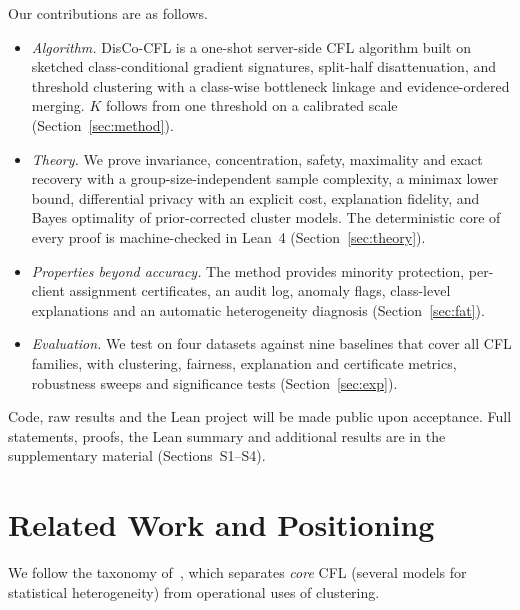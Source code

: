 \documentclass[journal]{IEEEtran}
\theoremstyle{definition}
\begin{document}
Our contributions are as follows.
\begin{itemize}
\item \emph{Algorithm.} DisCo-CFL is a one-shot server-side CFL algorithm built on sketched class-conditional gradient signatures, split-half disattenuation, and threshold clustering with a class-wise bottleneck linkage and evidence-ordered merging. $K$ follows from one threshold on a calibrated scale (Section~\ref{sec:method}).
\item \emph{Theory.} We prove invariance, concentration, safety, maximality and exact recovery with a group-size-independent sample complexity, a minimax lower bound, differential privacy with an explicit cost, explanation fidelity, and Bayes optimality of prior-corrected cluster models. The deterministic core of every proof is machine-checked in Lean~4 (Section~\ref{sec:theory}).
\item \emph{Properties beyond accuracy.} The method provides minority protection, per-client assignment certificates, an audit log, anomaly flags, class-level explanations and an automatic heterogeneity diagnosis (Section~\ref{sec:fat}).
\item \emph{Evaluation.} We test on four datasets against nine baselines that cover all CFL families, with clustering, fairness, explanation and certificate metrics, robustness sweeps and significance tests (Section~\ref{sec:exp}).
\end{itemize}
Code, raw results and the Lean project will be made public upon acceptance. Full statements, proofs, the Lean summary and additional results are in the supplementary material (Sections~S1--S4).

\section{Related Work and Positioning}\label{sec:related}
We follow the taxonomy of~\cite{benali2026survey}, which separates \emph{core} CFL (several models for statistical heterogeneity) from operational uses of clustering.
\end{document}
